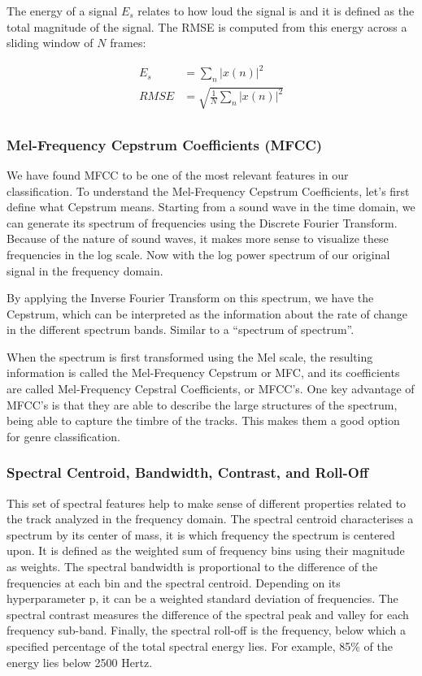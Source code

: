 The energy of a signal $E_s$ relates to how loud the signal is and it is defined as the total magnitude of the signal. The RMSE is computed from this energy across a sliding window of $N$ frames:

\begin{align*}
    E_{s}   &=  \sum_{n}^{}{|x(n)|^2} \\
    RMSE    &= \sqrt{ \frac{1}{N} \sum_n \left| x(n) \right|^2 } \\
\end{align*}

\subsubsection{Mel-Frequency Cepstrum Coefficients (MFCC)}

We have found MFCC to be one of the most relevant features in our classification. To understand the Mel-Frequency Cepstrum Coefficients, let's first define what Cepstrum means. Starting from a sound wave in the time domain, we can generate its spectrum of frequencies using the Discrete Fourier Transform. Because of the nature of sound waves, it makes more sense to visualize these frequencies in the log scale. Now with the log power spectrum of our original signal in the frequency domain.

By applying the Inverse Fourier Transform on this spectrum, we have the Cepstrum, which can be interpreted as the information about the rate of change in the different spectrum bands. Similar to a “spectrum of spectrum”.

When the spectrum is first transformed using the Mel scale, the resulting information is called the Mel-Frequency Cepstrum or MFC, and its coefficients are called Mel-Frequency Cepstral Coefficients, or MFCC’s. One key advantage of MFCC’s is that they are able to describe the large structures of the spectrum, being able to capture the timbre of the tracks. This makes them a good option for genre classification.

\subsubsection{Spectral Centroid, Bandwidth, Contrast, and Roll-Off}

This set of spectral features help to make sense of different properties related to the track analyzed in the frequency domain. The spectral centroid characterises a spectrum by its center of mass, it is which frequency the spectrum is centered upon. It is defined as the weighted sum of frequency bins using their magnitude as weights. The spectral bandwidth is proportional to the difference of the frequencies at each bin and the spectral centroid. Depending on its hyperparameter p, it can be a weighted standard deviation of frequencies. The spectral contrast measures the difference of the spectral peak and valley for each frequency sub-band. Finally, the spectral roll-off is the frequency, below which a specified percentage of the total spectral energy lies. For example, 85\% of the energy lies below 2500 Hertz.

